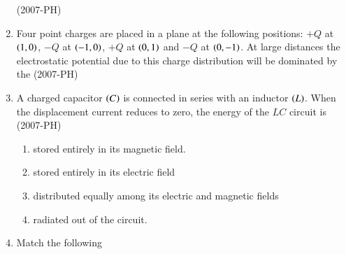 \documentclass[journal]{IEEEtran}
\begin{document}
\begin{enumerate}
    \hfill (2007-PH)
    \begin{enumerate}
    \end{enumerate}
    \item Four point charges are placed in a plane at the following positions: $+Q$ at $\left(1,0\right)$, $-Q$ at $\left(-1,0\right)$, $+Q$ at $\left(0,1\right)$ and $-Q$ at $\left(0,-1\right)$. At large distances the electrostatic potential due to this charge distribution will be dominated by the \hfill (2007-PH)
    \begin{enumerate}
    \end{enumerate}
    \item A charged capacitor $\left(C\right)$ is connected in series with an inductor $\left(L\right)$. When the displacement current reduces to zero, the energy of the $LC$ circuit is \hfill (2007-PH)
    \begin{enumerate}
            \item stored entirely in its magnetic field.
            \item stored entirely in its electric field
            \item distributed equally among its electric and magnetic fields
            \item radiated out of the circuit.
    \end{enumerate}
    \item Match the following 
    \begin{table}[!h]
        \centering
        
    \end{table} 
    
    \begin{table}[H]
        \centering
        
    \end{table} 


\end{enumerate}
\end{document}
